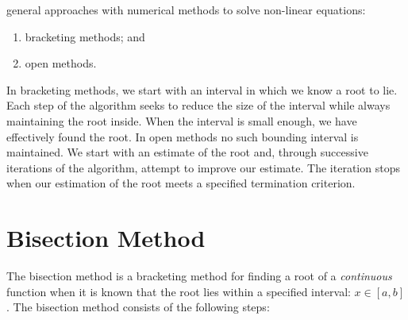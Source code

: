  general approaches with numerical methods to solve non-linear equations:
\begin{enumerate}
\item bracketing methods; and
\item open methods.
\end{enumerate}
In bracketing methods, we start with an interval in which we know a root to lie.  Each step of the algorithm seeks to reduce the size of the interval while always maintaining the root inside.  When the interval is small enough, we have effectively found the root.  In open methods no such bounding interval is maintained.  We start with an estimate of the root and, through successive iterations of the algorithm, attempt to improve our estimate.  The iteration stops when our estimation of the root meets a specified termination criterion.  

\section{Bisection Method}
The bisection method is a bracketing method for finding a root of a \emph{continuous} function when it is known that the root lies within a specified interval: $x \in [a,b]$.  The bisection method consists of the following steps:

